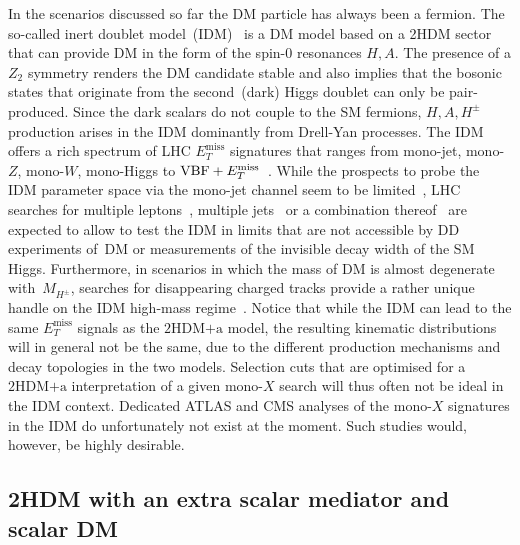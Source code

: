 \documentclass[a4paper, 11pt,notoc]{article}
\newcommand{\MET}{\ensuremath{E_T^\mathrm{miss}}\xspace}
\newcommand{\hdma}{\ensuremath{\textrm{2HDM+a}}\xspace}
\begin{document}
In the scenarios discussed so far the DM particle has always been a fermion. The so-called inert doublet model~(IDM)~\cite{Deshpande:1977rw,Barbieri:2006dq,Cao:2007rm} is a DM model based on a 2HDM sector that can provide DM in the form of the spin-0 resonances $H, A$.  The presence of a $Z_2$ symmetry renders the DM candidate stable and also implies  that the bosonic states  that originate from the second~(dark) Higgs doublet can only be pair-produced. Since the dark scalars do not couple to the SM fermions, $H,A,H^\pm$ production arises in the IDM dominantly from Drell-Yan processes. The IDM offers a rich spectrum of LHC $\MET$ signatures that ranges from mono-jet, mono-$Z$, mono-$W$, mono-Higgs to  ${\rm VBF}+\MET$~\cite{Dolle:2009ft,Miao:2010rg,Gustafsson:2012aj,Belanger:2015kga,Ilnicka:2015jba,Poulose:2016lvz,Datta:2016nfz,Hashemi:2016wup,deFlorian:2016spz,Belyaev:2016lok,Dutta:2017lny,Wan:2018eaz}.  While the prospects to probe the IDM parameter space via the mono-jet channel seem to be limited~\cite{Belyaev:2016lok}, LHC searches for multiple leptons~\cite{Dolle:2009ft,Miao:2010rg,Gustafsson:2012aj,Belanger:2015kga,Datta:2016nfz,Hashemi:2016wup}, multiple jets~\cite{Poulose:2016lvz,Dutta:2017lny}  or a combination thereof~\cite{Hashemi:2016wup,Wan:2018eaz} are expected to allow to test the IDM in limits that are not accessible by DD experiments of~DM or measurements of the invisible decay width of the SM Higgs. Furthermore, in scenarios in which the mass of DM is almost degenerate with~$M_{H^\pm}$, searches for disappearing charged tracks provide a rather unique handle on the IDM high-mass regime~\cite{Belyaev:2016lok}. Notice that while the IDM can lead to the same $\MET$ signals  as the \hdma model, the resulting kinematic distributions will in general not be the same, due to the different production mechanisms and decay topologies in the two models. Selection cuts that are optimised for a \hdma interpretation of a given mono-$X$ search will thus often not be ideal in the IDM context. Dedicated ATLAS and CMS  analyses of the mono-$X$ signatures in the IDM do unfortunately not exist at the moment. Such studies would, however, be highly desirable.

\subsection*{2HDM with an extra scalar mediator and scalar DM}
\end{document}
